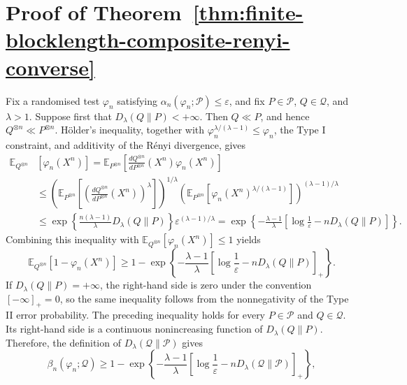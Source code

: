\documentclass[journal,12pt,draftclsnofoot,onecolumn]{IEEEtran}
\begin{document}
\section{Proof of Theorem~\ref{thm:finite-blocklength-composite-renyi-converse}}
\label{app:finite-blocklength-composite-renyi-converse}
\begin{IEEEproof}
Fix a randomised test $\varphi_n$ satisfying
$\alpha_n(\varphi_n;\mathcal P)\leq\varepsilon$, and fix $P\in\mathcal P$, $Q\in\mathcal Q$, and $\lambda>1$. Suppose first that $D_\lambda(Q\|P)<+\infty$. Then $Q\ll P$, and hence $Q^{\otimes n}\ll P^{\otimes n}$. H\"older's inequality, together with $\varphi_n^{\lambda/(\lambda-1)}\leq\varphi_n$, the Type I constraint, and additivity of the R\'enyi divergence, gives
\begin{equation*}
\begin{aligned}
\mathbb E_{Q^{\otimes n}} &\left[\varphi_n(X^n) \right] = \mathbb E_{P^{\otimes n}}\left[\frac{dQ^{\otimes n}}{dP^{\otimes n}}(X^n) \varphi_n(X^n)\right]\\
&\leq\left(
\mathbb E_{P^{\otimes n}}
\left[\left(\frac{dQ^{\otimes n}}{dP^{\otimes n}}(X^n)\right)^\lambda\right]\right)^{1/\lambda}\left(\mathbb E_{P^{\otimes n}}
\left[\varphi_n(X^n)^{\lambda/(\lambda-1)}
\right]\right)^{(\lambda-1)/\lambda}\\
&\leq\exp\left\{\frac{n(\lambda-1)}{\lambda}
D_\lambda(Q\|P)\right\}\varepsilon^{(\lambda-1)/\lambda}=\exp\left\{-\frac{\lambda-1}{\lambda}
\left[\log\frac{1}{\varepsilon}-nD_\lambda(Q\|P)\right]\right\}.
\end{aligned}
\end{equation*}
Combining this inequality with
$\mathbb E_{Q^{\otimes n}}[\varphi_n(X^n)]\leq1$ yields
\begin{equation*}
\mathbb E_{Q^{\otimes n}}\left[1-\varphi_n(X^n)\right]\geq 1-\exp\left\{-\frac{\lambda-1}{\lambda}\left[\log\frac{1}{\varepsilon}-nD_\lambda(Q\|P)\right]_+\right\}.
\end{equation*}
If $D_\lambda(Q\|P)=+\infty$, the right-hand side is zero under the convention $[-\infty]_+=0$, so the same inequality follows from the nonnegativity of the Type II error probability. The preceding inequality holds for every $P\in\mathcal P$ and $Q\in\mathcal Q$. Its right-hand side is a continuous nonincreasing function of $D_\lambda(Q\|P)$. Therefore, the definition of $D_\lambda(\mathcal Q\|\mathcal P)$ gives
\begin{equation*}
\beta_n(\varphi_n;\mathcal Q)\geq 1- \exp\left\{-\frac{\lambda-1}{\lambda}\left[\log\frac{1}{\varepsilon}-nD_\lambda(\mathcal Q\|\mathcal P)\right]_+\right\},

\end{equation*}
\end{IEEEproof}
\end{document}
